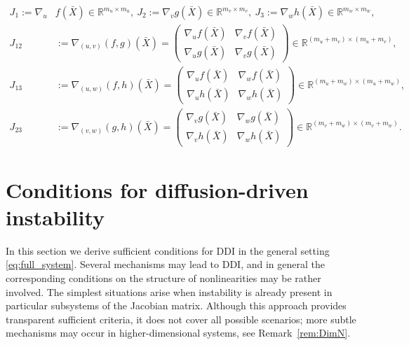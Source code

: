 \documentclass[12pt, a4paper]{amsart}
\numberwithin{equation}{section}
\newcommand{\CSS}{\bar{X}}
\newcommand{\un}{u}
\newcommand{\us}{v}
\newcommand{\uf}{w}
\newcommand{\mn}{m_{u}}  %
\newcommand{\ms}{m_{v}}  %
\newcommand{\mfa}{m_{w}} %
\newcommand{\fn}{f}
\newcommand{\fs}{g}
\newcommand{\ffa}{h}
\begin{document}
\begin{equation}
\begin{aligned}
\label{eq:definition_submatrices}
    J_1 := \nabla_{\un} &\fn(\CSS)\in\mathbb{R}^{\mn\times\mn},\ J_2 := \nabla_{\us} \fs(\CSS)\in\mathbb{R}^{\ms\times\ms},\ J_3 := \nabla_{\uf} \ffa(\CSS)\in\mathbb{R}^{\mfa\times\mfa},\\
    J_{12} &:= \nabla_{(\un, \us)} (\fn,\fs)(\CSS) = \begin{pmatrix}
        \nabla_{\un} \fn(\CSS) & \nabla_{\us} \fn(\CSS) \\
        \nabla_{\un} \fs(\CSS) & \nabla_{\us} \fs(\CSS)
    \end{pmatrix} \in\mathbb{R}^{(\mn + \ms)\times(\mn + \ms)},\\
    J_{13} &:= \nabla_{(\un, \uf)} (\fn,\ffa)(\CSS) = \begin{pmatrix}
        \nabla_{\un} \fn(\CSS) & \nabla_{\uf} \fn(\CSS) \\
        \nabla_{\un} \ffa(\CSS) & \nabla_{\uf} \ffa(\CSS)
    \end{pmatrix} \in\mathbb{R}^{(\mn + \mfa)\times(\mn + \mfa)}, \\
    J_{23} &:= \nabla_{(\us, \uf)} (\fs,\ffa)(\CSS) = \begin{pmatrix}
        \nabla_{\us} \fs(\CSS) & \nabla_{\uf} \fs(\CSS) \\
        \nabla_{\us} \ffa(\CSS) & \nabla_{\uf} \ffa(\CSS)
    \end{pmatrix} \in\mathbb{R}^{(\ms + \mfa)\times(\ms + \mfa)}.
\end{aligned}
\end{equation}


\section{Conditions for diffusion-driven instability}\label{sec:general_theory}

In this section we derive sufficient conditions for DDI in the general setting \eqref{eq:full_system}. {Several mechanisms may lead to DDI, and in general the corresponding conditions on the structure of nonlinearities may be rather involved. The simplest situations arise when instability is already present in particular subsystems of the Jacobian matrix. Although this approach provides transparent sufficient criteria, it does not cover all possible scenarios; more subtle mechanisms may occur in higher-dimensional systems, see Remark~\ref{rem:DimN}}.
\end{document}
